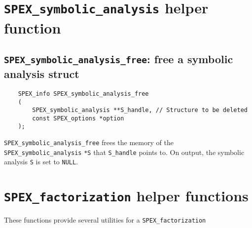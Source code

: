 \documentclass[12pt]{report}
\theoremstyle{definition}
\begin{document}
\section{\texttt{SPEX\_symbolic\_analysis} helper function} \label{s:spex_symbolic_analysis_helper}

\subsection{\texttt{SPEX\_symbolic\_analysis\_free}: free a symbolic analysis struct}
\begin{mdframed}[userdefinedwidth=6in]
{\footnotesize
\begin{verbatim}
    SPEX_info SPEX_symbolic_analysis_free
    (
        SPEX_symbolic_analysis **S_handle, // Structure to be deleted
        const SPEX_options *option
    ); 
\end{verbatim}
} \end{mdframed}

\verb|SPEX_symbolic_analysis_free| frees the memory of the \verb|SPEX_symbolic_analysis| \verb|*S| that \verb|S_handle| points to. On output, the symbolic analysis \verb|S| is set to \verb|NULL|.


\section{\texttt{SPEX\_factorization} helper functions} \label{s:spex_factorization_helper}

These functions provide several utilities for a \verb|SPEX_factorization|

\end{document}
